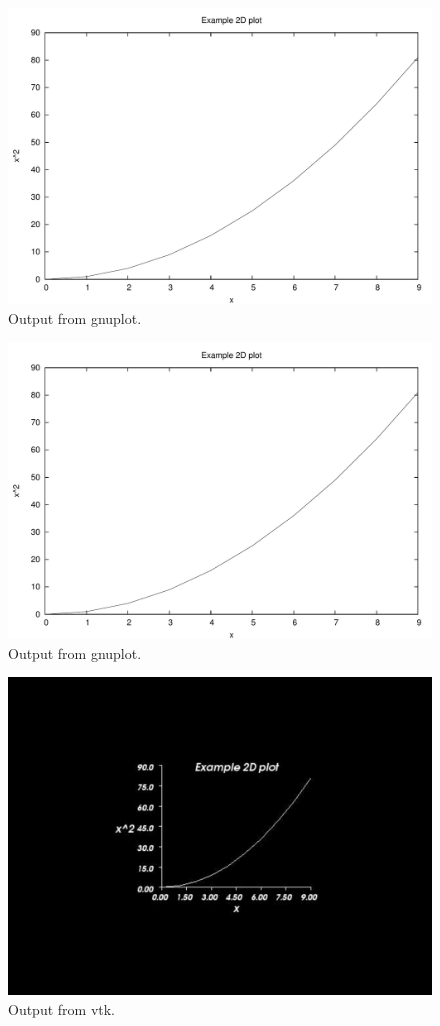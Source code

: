 \ifpdf
\begin{figure}
\centerline{%
\includegraphics[width=\figwidth]{figures/plotExampleGnuplot}%
}
\caption{Output from gnuplot.}
\end{figure}
\else
\begin{figure}
\centerline{%
\includegraphics[width=\figwidth,angle=-90]{figures/plotExampleGnuplot}%
}
\caption{Output from gnuplot.}
\end{figure}
\fi

\begin{figure}
\centerline{%
\includegraphics[width=\figwidth]{figures/plotExampleVTK}%
}
\caption{Output from vtk.}
\end{figure}

